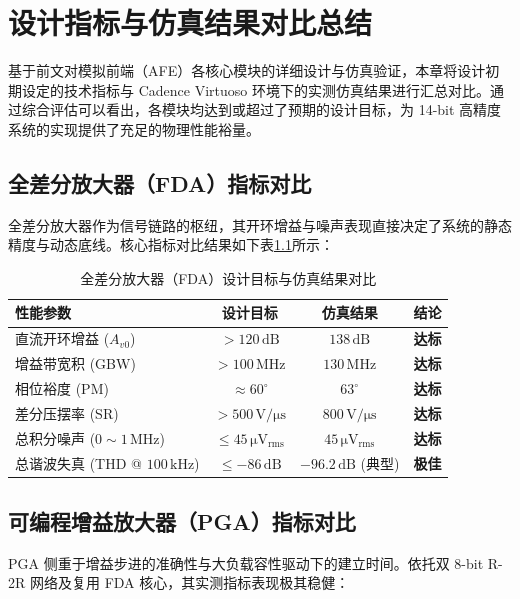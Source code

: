 \chapter{设计指标与仿真结果对比总结}

基于前文对模拟前端（AFE）各核心模块的详细设计与仿真验证，本章将设计初期设定的技术指标与 Cadence Virtuoso 环境下的实测仿真结果进行汇总对比。通过综合评估可以看出，各模块均达到或超过了预期的设计目标，为 14-bit 高精度系统的实现提供了充足的物理性能裕量。

\section{全差分放大器（FDA）指标对比}

全差分放大器作为信号链路的枢纽，其开环增益与噪声表现直接决定了系统的静态精度与动态底线。核心指标对比结果如下表\ref{tab:compare_fda}所示：

\begin{table}[H]
\centering
\caption{全差分放大器（FDA）设计目标与仿真结果对比}
\label{tab:compare_fda}
\begin{tabular}{lccc}
\toprule
\textbf{性能参数} & \textbf{设计目标} & \textbf{仿真结果} & \textbf{结论} \\
\midrule
直流开环增益 ($A_{v0}$) & $> 120\,\mathrm{dB}$ & $138\,\mathrm{dB}$ & \textbf{达标} \\
增益带宽积 (GBW) & $> 100\,\mathrm{MHz}$ & $130\,\mathrm{MHz}$ & \textbf{达标} \\
相位裕度 (PM) & $\approx 60^\circ$ & $63^\circ$ & \textbf{达标} \\
差分压摆率 (SR) & $> 500\,\mathrm{V/\mu s}$ & $800\,\mathrm{V/\mu s}$ & \textbf{达标} \\
总积分噪声 ($0 \sim 1\,\mathrm{MHz}$) & $\le 45\,\mathrm{\mu V_{rms}}$ & $45\,\mathrm{\mu V_{rms}}$ & \textbf{达标} \\
总谐波失真 (THD @ $100\,\mathrm{kHz}$) & $\le -86\,\mathrm{dB}$ & $-96.2\,\mathrm{dB}$ (典型) & \textbf{极佳} \\
\bottomrule
\end{tabular}
\end{table}

\section{可编程增益放大器（PGA）指标对比}

PGA 侧重于增益步进的准确性与大负载容性驱动下的建立时间。依托双 8-bit R-2R 网络及复用 FDA 核心，其实测指标表现极其稳健：

